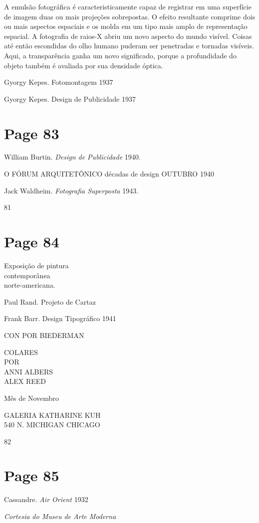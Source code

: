 \documentclass[a4paper]{article}
\begin{document}
A emulsão fotográfica é caracteristicamente capaz de registrar em uma superfície de imagem duas ou mais projeções sobrepostas. O efeito resultante comprime dois ou mais aspectos espaciais e os molda em um tipo mais amplo de representação espacial. A fotografia de raios-X abriu um novo aspecto do mundo visível. Coisas até então escondidas do olho humano puderam ser penetradas e tornadas visíveis. Aqui, a transparência ganha um novo significado, porque a profundidade do objeto também é avaliada por sua densidade óptica.

Gyorgy Kepes. Fotomontagem 1937

Gyorgy Kepes. Design de Publicidade 1937

\newpage
\section*{Page 83}

William Burtin. \textit{Design de Publicidade} 1940.

O FÓRUM ARQUITETÔNICO
décadas de design
OUTUBRO 1940

Jack Waldheim. \textit{Fotografia Superposta} 1943.

81

\newpage
\section*{Page 84}

\raggedright
Exposição de pintura \\
contemporânea \\
norte-americana.

Paul Rand. Projeto de Cartaz

Frank Barr. Design Tipográfico 1941

CON POR BIEDERMAN

COLARES \\
POR \\
ANNI ALBERS \\
ALEX REED

Mês de Novembro

GALERIA KATHARINE KUH \\
540 N. MICHIGAN CHICAGO

82

\newpage
\section*{Page 85}

Cassandre. \textit{Air Orient} 1932\par
\textit{Cortesia do Museu de Arte Moderna}\par
\end{document}

